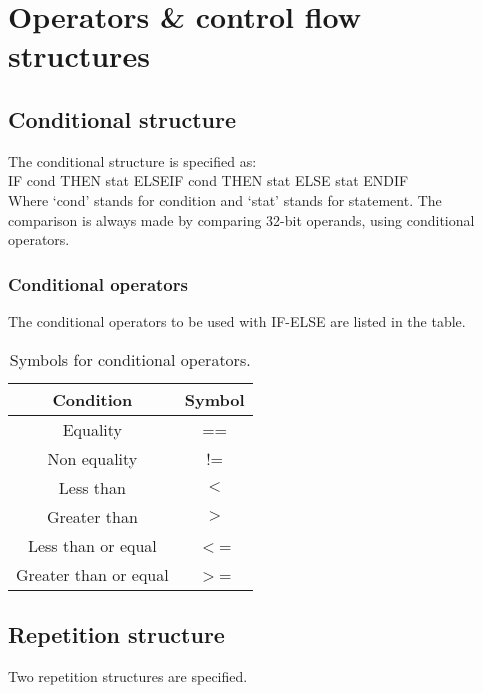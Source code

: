 \documentclass[12pt]{article}
\begin{document}
\section{Operators \& control flow structures}

\subsection{Conditional structure}

The conditional structure is specified as:\\

IF cond THEN stat ELSEIF cond THEN stat ELSE stat ENDIF\\

Where `cond' stands for condition and `stat' stands for statement.
The comparison is always made by comparing 32-bit operands, using conditional operators.\\

\subsubsection{Conditional operators}
The conditional operators to be used with IF-ELSE  are listed in the table.\\


\begin{table}[ht]
\begin{center}
\begin{tabular}{|c|c|}
  \hline
  Condition & Symbol \\
  \hline
  \hline
  Equality &  ==  \\
  \hline
  Non equality & !=\\
  \hline
  Less than &  $<$ \\
  \hline
  Greater than & $>$ \\
  \hline
  Less than or equal & $<$= \\
  \hline
  Greater than or equal&  $>$=\\
  \hline

\end{tabular}
\end{center}
\caption{Symbols for conditional operators.}
\end{table}



\subsection{Repetition structure}
Two repetition structures are specified.
\end{document}
